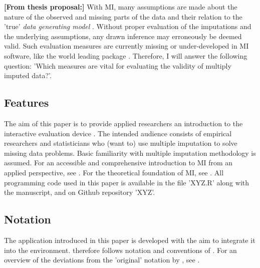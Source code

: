 \documentclass[article]{jss}
\begin{document}
\textbf{[From thesis proposal:]} With MI, many assumptions are made about the nature of the observed and missing parts of the data and their relation to the 'true' \emph{data generating model} \citep{buur18}. Without proper evaluation of the imputations and the underlying assumptions, any drawn inference may erroneously be deemed valid. Such evaluation measures are currently missing or under-developed in MI software, like the world leading  package  \citep{mice}. Therefore, I will answer the following question: 'Which measures are vital for evaluating the validity of multiply imputed data?'.

\subsection{Features} \label{sec:features}

The aim of this paper is to provide applied researchers an introduction to the interactive evaluation device . The intended audience consists of empirical researchers and statisticians who (want to) use multiple imputation to solve missing data problems. Basic familiarity with multiple imputation methodology is assumed. For an accessible and comprehensive introduction to MI from an applied perspective, see \cite{buur18}. For the theoretical foundation of MI, see \cite{rubin87}. All programming code used in this paper is available in the file 'XYZ.R' along with the manuscript, and on Github repository 'XYZ'. 


\subsection{Notation} \label{sec:notation}

The   application introduced in this paper is developed with the aim to integrate it into the  environment.  therefore follows notation and conventions of \cite{mice}. For an overview of the deviations from the 'original' notation by \cite{rubin87}, see \cite{buur18}. 
\end{document}
